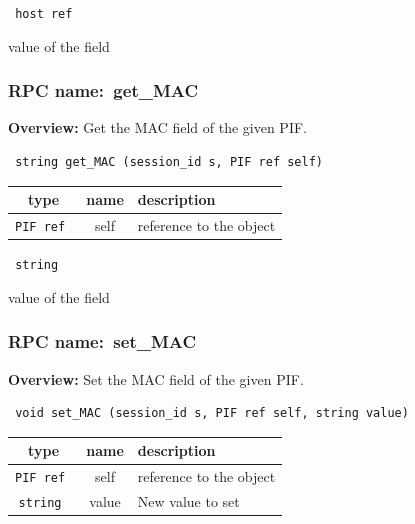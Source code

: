 \vspace{0.3cm}

{\tt 
host ref
}


value of the field
\vspace{0.3cm}
\vspace{0.3cm}
\vspace{0.3cm}
\subsubsection{RPC name:~get\_MAC}

{\bf Overview:} 
Get the MAC field of the given PIF.

\begin{verbatim} string get_MAC (session_id s, PIF ref self)\end{verbatim}



 
\vspace{0.3cm}
\begin{tabular}{|c|c|p{7cm}|}
 \hline
{\bf type} & {\bf name} & {\bf description} \\ \hline
{\tt PIF ref } & self & reference to the object \\ \hline 

\end{tabular}

\vspace{0.3cm}

{\tt 
string
}


value of the field
\vspace{0.3cm}
\vspace{0.3cm}
\vspace{0.3cm}
\subsubsection{RPC name:~set\_MAC}

{\bf Overview:} 
Set the MAC field of the given PIF.

\begin{verbatim} void set_MAC (session_id s, PIF ref self, string value)\end{verbatim}



 
\vspace{0.3cm}
\begin{tabular}{|c|c|p{7cm}|}
 \hline
{\bf type} & {\bf name} & {\bf description} \\ \hline
{\tt PIF ref } & self & reference to the object \\ \hline 

{\tt string } & value & New value to set \\ \hline 

\end{tabular}

